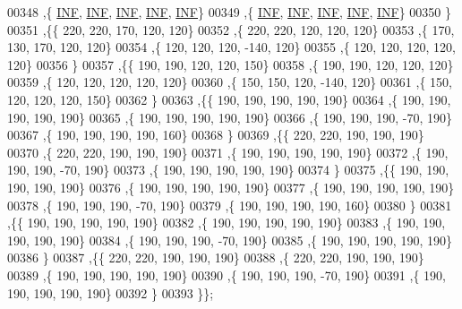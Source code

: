 \begin{DoxyCode}
00348   ,\{   \mbox{\hyperlink{1_88_84__epars_8h_a12c2040f25d8e3a7b9e1c2024c618cb6}{INF}},   \mbox{\hyperlink{1_88_84__epars_8h_a12c2040f25d8e3a7b9e1c2024c618cb6}{INF}},   \mbox{\hyperlink{1_88_84__epars_8h_a12c2040f25d8e3a7b9e1c2024c618cb6}{INF}},   \mbox{\hyperlink{1_88_84__epars_8h_a12c2040f25d8e3a7b9e1c2024c618cb6}{INF}},   \mbox{\hyperlink{1_88_84__epars_8h_a12c2040f25d8e3a7b9e1c2024c618cb6}{INF}}\}
00349   ,\{   \mbox{\hyperlink{1_88_84__epars_8h_a12c2040f25d8e3a7b9e1c2024c618cb6}{INF}},   \mbox{\hyperlink{1_88_84__epars_8h_a12c2040f25d8e3a7b9e1c2024c618cb6}{INF}},   \mbox{\hyperlink{1_88_84__epars_8h_a12c2040f25d8e3a7b9e1c2024c618cb6}{INF}},   \mbox{\hyperlink{1_88_84__epars_8h_a12c2040f25d8e3a7b9e1c2024c618cb6}{INF}},   \mbox{\hyperlink{1_88_84__epars_8h_a12c2040f25d8e3a7b9e1c2024c618cb6}{INF}}\}
00350   \}
00351  ,\{\{   220,   220,   170,   120,   120\}
00352   ,\{   220,   220,   120,   120,   120\}
00353   ,\{   170,   130,   170,   120,   120\}
00354   ,\{   120,   120,   120,  -140,   120\}
00355   ,\{   120,   120,   120,   120,   120\}
00356   \}
00357  ,\{\{   190,   190,   120,   120,   150\}
00358   ,\{   190,   190,   120,   120,   120\}
00359   ,\{   120,   120,   120,   120,   120\}
00360   ,\{   150,   150,   120,  -140,   120\}
00361   ,\{   150,   120,   120,   120,   150\}
00362   \}
00363  ,\{\{   190,   190,   190,   190,   190\}
00364   ,\{   190,   190,   190,   190,   190\}
00365   ,\{   190,   190,   190,   190,   190\}
00366   ,\{   190,   190,   190,   -70,   190\}
00367   ,\{   190,   190,   190,   190,   160\}
00368   \}
00369  ,\{\{   220,   220,   190,   190,   190\}
00370   ,\{   220,   220,   190,   190,   190\}
00371   ,\{   190,   190,   190,   190,   190\}
00372   ,\{   190,   190,   190,   -70,   190\}
00373   ,\{   190,   190,   190,   190,   190\}
00374   \}
00375  ,\{\{   190,   190,   190,   190,   190\}
00376   ,\{   190,   190,   190,   190,   190\}
00377   ,\{   190,   190,   190,   190,   190\}
00378   ,\{   190,   190,   190,   -70,   190\}
00379   ,\{   190,   190,   190,   190,   160\}
00380   \}
00381  ,\{\{   190,   190,   190,   190,   190\}
00382   ,\{   190,   190,   190,   190,   190\}
00383   ,\{   190,   190,   190,   190,   190\}
00384   ,\{   190,   190,   190,   -70,   190\}
00385   ,\{   190,   190,   190,   190,   190\}
00386   \}
00387  ,\{\{   220,   220,   190,   190,   190\}
00388   ,\{   220,   220,   190,   190,   190\}
00389   ,\{   190,   190,   190,   190,   190\}
00390   ,\{   190,   190,   190,   -70,   190\}
00391   ,\{   190,   190,   190,   190,   190\}
00392   \}
00393  \}\};
\end{DoxyCode}
